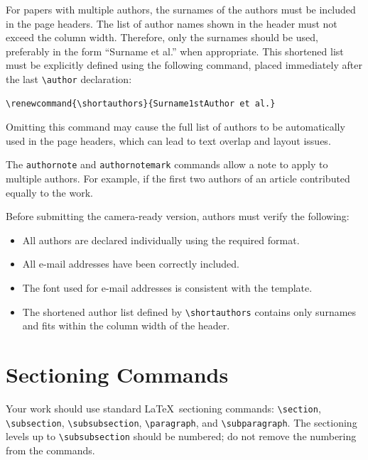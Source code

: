 For papers with multiple authors, the surnames of the authors must be included in the page headers. The list of author names shown in the header must not exceed the column width. Therefore, only the surnames should be used, preferably in the form ``Surname et al.'' when appropriate. This shortened list must be explicitly defined using the following command, placed immediately after the last \verb|\author| declaration:

\begin{verbatim}
\renewcommand{\shortauthors}{Surname1stAuthor et al.}
\end{verbatim}

Omitting this command may cause the full list of authors to be automatically used in the page headers, which can lead to text overlap and layout issues.

The \verb|authornote| and \verb|authornotemark| commands allow a note
to apply to multiple authors. For example, if the first two authors
of an article contributed equally to the work.

Before submitting the camera-ready version, authors must verify the following:
\begin{itemize}
  \item All authors are declared individually using the required format.
  \item All e-mail addresses have been correctly included.
  \item The font used for e-mail addresses is consistent with the template.
  \item The shortened author list defined by \verb|\shortauthors| contains only surnames and fits within the column width of the header.
\end{itemize}

\section{Sectioning Commands}

Your work should use standard \LaTeX\ sectioning commands:
\verb|\section|, \verb|\subsection|, \verb|\subsubsection|,
\verb|\paragraph|, and \verb|\subparagraph|. The sectioning levels up to
\verb|\subsubsection| should be numbered; do not remove the numbering
from the commands.


